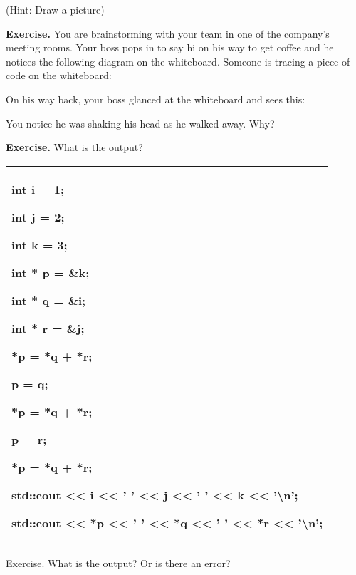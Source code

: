 \documentclass[
]{article}
\begin{document}
(Hint: Draw a picture)

\textbf{Exercise.} You are brainstorming with your team in one of the
company's meeting rooms. Your boss pops in to say hi on his way to get
coffee and he notices the following diagram on the whiteboard. Someone
is tracing a piece of code on the whiteboard:

On his way back, your boss glanced at the whiteboard and sees this:

You notice he was shaking his head as he walked away. Why?

\textbf{Exercise.} What is the output?

\begin{longtable}[]{@{}l@{}}
\toprule
\endhead
\begin{minipage}[t]{0.97\columnwidth}\raggedright
int i = 1;

int j = 2;

int k = 3;

int * p = \&k;

int * q = \&i;

int * r = \&j;

*p = *q + *r;

p = q;

*p = *q + *r;

p = r;

*p = *q + *r;

std::cout \textless\textless{} i \textless\textless{} ' '
\textless\textless{} j \textless\textless{} ' ' \textless\textless{} k
\textless\textless{} '\textbackslash n';

std::cout \textless\textless{} *p \textless\textless{} ' '
\textless\textless{} *q \textless\textless{} ' ' \textless\textless{} *r
\textless\textless{} '\textbackslash n'; \strut
\end{minipage}\tabularnewline
\bottomrule
\end{longtable}

Exercise. What is the output? Or is there an error?
\end{document}
